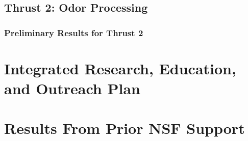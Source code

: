 \documentclass[11 pt]{article}
\begin{document}
\subsection{Thrust 2: Odor Processing}
\label{sec:tract2}
\label{ssec:research2}


\subsubsection{Preliminary Results for Thrust 2}
\label{ssec:prelim2}


\section{Integrated Research, Education, and Outreach Plan}
\label{sec:irep}
\label{irep}

\section{Results From Prior NSF Support}
\label{sec:prior_nsf}

\end{document}
